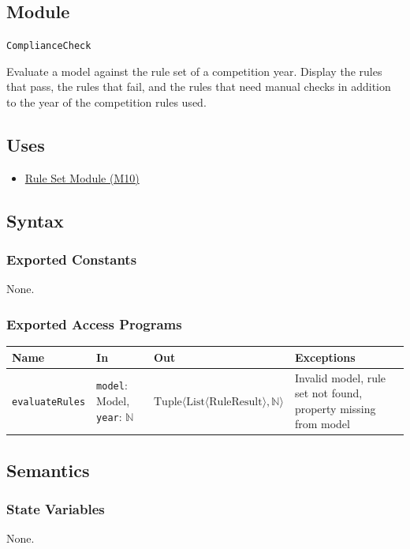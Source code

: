\documentclass[12pt, titlepage]{article}
\begin{document}
\subsection{Module}
\texttt{ComplianceCheck}

Evaluate a model against the rule set of a competition year. Display the rules that pass, the rules that fail, and the rules that need manual checks in addition to the year of the competition rules used.

\subsection{Uses}
\begin{itemize}
  \item \hyperref[mRuleSet]{Rule Set Module (M10)}
\end{itemize}

\subsection{Syntax}

\subsubsection{Exported Constants}
None.

\subsubsection{Exported Access Programs}
\begin{tabularx}{\textwidth}{p{2.9cm} p{4.2cm} p{4.8cm} X}
\toprule
\textbf{Name} & \textbf{In} & \textbf{Out} & \textbf{Exceptions} \\
\midrule
\texttt{evaluateRules} & \texttt{model}: Model, \texttt{year}: $\mathbb{N}$ & $\text{Tuple}\langle \text{List}\langle \text{RuleResult} \rangle, \mathbb{N} \rangle$ & Invalid model, rule set not found, property missing from model \\
\bottomrule
\end{tabularx}

\subsection{Semantics}

\subsubsection{State Variables}
None.
\end{document}
